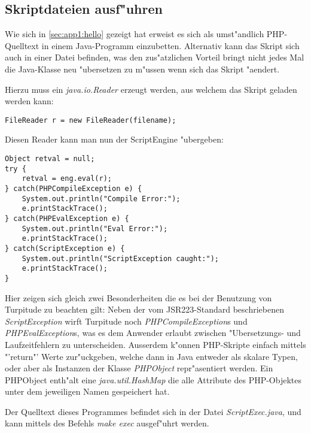 \subsection{Skriptdateien ausf"uhren}
\label{sec:app1:execute}

Wie sich in \ref{sec:app1:hello} gezeigt hat erweist es sich als umst"andlich PHP-Quelltext
in einem Java-Programm einzubetten. Alternativ kann das Skript sich auch in einer Datei befinden,
was den zus"atzlichen Vorteil bringt nicht jedes Mal die Java-Klasse neu "ubersetzen zu m"ussen 
wenn sich das Skript "aendert.

Hierzu muss ein \emph{java.io.Reader} erzeugt werden, aus welchem das Skript geladen werden kann:
\begin{lstlisting}[caption=Laden eines Skriptes aus einer Datei]
FileReader r = new FileReader(filename);
\end{lstlisting}
Diesen Reader kann man nun der ScriptEngine "ubergeben:
\begin{lstlisting}[caption="Ubergabe des Readers]
Object retval = null;
try {
    retval = eng.eval(r);
} catch(PHPCompileException e) {
    System.out.println("Compile Error:");
    e.printStackTrace();
} catch(PHPEvalException e) {
    System.out.println("Eval Error:");
    e.printStackTrace();
} catch(ScriptException e) {
    System.out.println("ScriptException caught:");
    e.printStackTrace();
}
\end{lstlisting}

Hier zeigen sich gleich zwei Besonderheiten die es bei der Benutzung von Turpitude zu beachten
gilt: Neben der vom JSR223-Standard beschriebenen \emph{ScriptException} wirft Turpitude noch 
\emph{PHPCompileException}s und \emph{PHPEvalException}s, was es dem Anwender erlaubt 
zwischen "Ubersetzungs- und Laufzeitfehlern zu unterscheiden.
Ausserdem k"onnen PHP-Skripte einfach mittels "'return"' Werte zur"uckgeben, welche dann in Java
entweder als skalare Typen, oder aber als Instanzen der Klasse \emph{PHPObject} repr"asentiert
werden. Ein PHPObject enth"alt eine \emph{java.util.HashMap} die alle Attribute des PHP-Objektes
unter dem jeweiligen Namen gespeichert hat.

Der Quelltext dieses Programmes befindet sich in der Datei \emph{ScriptExec.java}, und kann
mittels des Befehls \emph{make exec} ausgef"uhrt werden.

